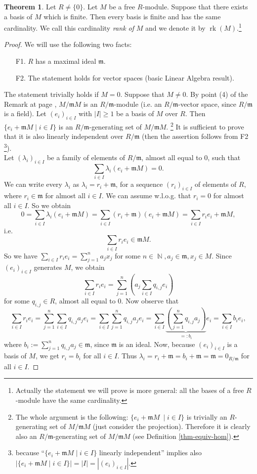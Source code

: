 \documentclass[12pt,a4paper]{report}
\theoremstyle{definition}
\newtheorem{theorem}{Theorem}[chapter] %
\theoremstyle{num.custom-title}
\DeclareMathOperator{\rk}{rk}
\DeclareMathOperator{\N}{\mathbb{N}}
\newcommand{\m}{\mathfrak{m}}
\begin{document}
\begin{theorem}
Let $R \neq \{0\}$. Let $M$ be a free $R$-module. Suppose that there exists a basis of $M$ which is finite. Then every basis is finite and has the same cardinality. We call this cardinality \emph{rank of} $M$ and we denote it by $\rk(M)$.\footnote{Actually the statement we will prove is more general: all the bases of a free $R$-module have the same cardinality.}
\begin{proof}
We will use the following two facts:
\begin{enumerate}
\item[F1.] $R$ has a maximal ideal $\m$.
\item[F2.] The statement holds for vector spaces (basic Linear Algebra result).
\end{enumerate}
The statement trivially holds if $M=0$. Suppose that $M \neq 0$. By point (4) of the Remark at page \pageref{fac-mod_fac-ring}, $M/\m M$ is an $R/\m$-module (i.e. an $R/\m$-vector space, since $R/\m$ is a field). Let $(e_i)_{i \in I}$ with $|I| \geq 1$ be a basis of $M$ over $R$. Then $\{e_i + \m M \mid i \in I\}$ is an $R/\m$-generating set of $M/\m M$. \footnote{The whole argument is the following: $\{e_i + \m M\ \mid i \in I\}$ is trivially an $R$-generating set of $M/\m M$ (just consider the projection). Therefore it is clearly also an $R/\m$-generating set of $M/\m M$ (see Definition \ref{thm-equiv-hom}).} It is sufficient to prove that it is also linearly independent over $R/\m$ (then the assertion follows from F2 \footnote{because ``$\{e_i + \m M \mid i \in I\}$ linearly independent'' implies also $|\{e_i + \m M \mid i \in I\}|=|I|=|(e_i)_{i \in I}|$.}).\\
Let $(\lambda_i)_{i \in I}$ be a family of elements of $R/\m$, almost all equal to $0$, such that
\[
\sum_{i \in I} \lambda_i (e_i + \m M) = 0.
\]
We can write every $\lambda_i$ as $\lambda_i = r_i + \m$, for a sequence $(r_i)_{i \in I}$ of elements of $R$, where $r_i \in \m$ for almost all $i \in I$. We can assume w.l.o.g. that $r_i = 0$ for almost all $i \in I$. So we obtain
\[
0 = \sum_{i \in I} \lambda_i (e_i + \m M) = \sum_{i \in I} (r_i + \m) (e_i + \m M) = \sum_{i \in I} r_i e_i + \m M,
\]
i.e.
\[
\sum_{i \in I} r_i e_i \in \m M.
\]
So we have $\sum_{i \in I} r_i e_i = \sum_{j=1}^n a_j x_j$ for some $n \in \N, a_j \in \m, x_j \in M$. Since $(e_i)_{i \in I}$ generates $M$, we obtain
\[
\sum_{i \in I} r_i e_i = \sum_{j=1}^n \left( a_j \sum_{i \in I} q_{i,j} e_i \right)
\]
for some $q_{i,j} \in R$, almost all equal to $0$. Now observe that
\[
\sum_{i \in I} r_i e_i = \sum_{j=1}^n \sum_{i \in I} q_{i,j} a_j e_i = \sum_{i \in I} \sum_{j=1}^n q_{i,j} a_j e_i = \sum_{i \in I} \underbrace{\left( \sum_{j=1}^n q_{i,j} a_j \right)}_{=: b_i} e_i = \sum_{i \in I} b_i e_i,
\]
where $b_i := \sum_{j=1}^n q_{i,j} a_j \in \m$, since $\m$ is an ideal.
Now, because $(e_i)_{i \in I}$ is a basis of $M$, we get $r_i = b_i$ for all $i \in I$. Thus $\lambda_i = r_i + \m = b_i + \m = \m = 0_{R/\m}$ for all $i \in I$.
\end{proof}
\end{theorem}
\end{document}

